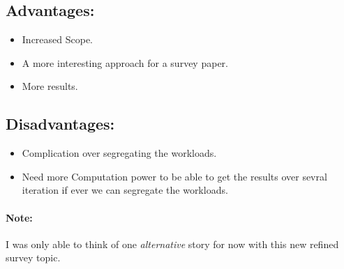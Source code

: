 \documentclass{article}
\begin{document}
\subsection*{Advantages: }
\begin{itemize}
    \item Increased Scope.
    \item A more interesting approach for a survey paper.
    \item More results.
\end{itemize}
\subsection*{Disadvantages: }
\begin{itemize}
    \item Complication over segregating the workloads.
    \item Need more Computation power to be able to get the results over sevral iteration if ever we can segregate the workloads.
\end{itemize}
\paragraph*{Note: }I was only able to think of one \emph{alternative} story for now with this new refined survey topic. 
\end{document}
